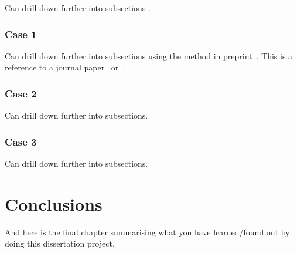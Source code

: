 Can drill down further into subsections \cite{Feller71}.

\subsection{Case 1}

Can drill down further into subsections using the method in preprint~\cite{Perelman}.
This is a reference to a journal paper~\cite{Akaike} or~\cite{GreengardRokhlin1987}.

\subsection{Case 2}

Can drill down further into subsections.

\subsection{Case 3}

Can drill down further into subsections.

\chapter{Conclusions}
And here is the final chapter summarising what you have learned/found out by doing this dissertation project.

